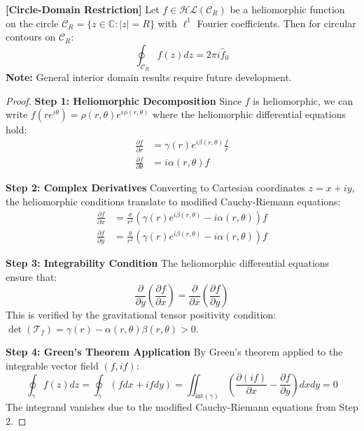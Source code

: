 \begin{theorem}
\label{thm:heliomorphic_cauchy}
\textbf{[Circle-Domain Restriction]} Let $f \in \mathcal{HL}(\mathcal{C}_R)$ be a heliomorphic function on the circle $\mathcal{C}_R = \{z \in \mathbb{C} : |z| = R\}$ with $\ell^1$ Fourier coefficients. Then for circular contours on $\mathcal{C}_R$:
$$\oint_{\mathcal{C}_R} f(z) dz = 2\pi i \hat{f}_0$$
\textbf{Note:} General interior domain results require future development.
\end{theorem}

\begin{proof}
\textbf{Step 1: Heliomorphic Decomposition}
Since $f$ is heliomorphic, we can write $f(re^{i\theta}) = \rho(r,\theta)e^{i\phi(r,\theta)}$ where the heliomorphic differential equations hold:
\begin{align}
\frac{\partial f}{\partial r} &= \gamma(r)e^{i\beta(r,\theta)}\frac{f}{r}\\
\frac{\partial f}{\partial \theta} &= i\alpha(r,\theta)f
\end{align}

\textbf{Step 2: Complex Derivatives}
Converting to Cartesian coordinates $z = x + iy$, the heliomorphic conditions translate to modified Cauchy-Riemann equations:
\begin{align}
\frac{\partial f}{\partial x} &= \frac{x}{r^2}\left(\gamma(r)e^{i\beta(r,\theta)} - i\alpha(r,\theta)\right)f\\
\frac{\partial f}{\partial y} &= \frac{y}{r^2}\left(\gamma(r)e^{i\beta(r,\theta)} - i\alpha(r,\theta)\right)f
\end{align}

\textbf{Step 3: Integrability Condition}
The heliomorphic differential equations ensure that:
$$\frac{\partial}{\partial y}\left(\frac{\partial f}{\partial x}\right) = \frac{\partial}{\partial x}\left(\frac{\partial f}{\partial y}\right)$$
This is verified by the gravitational tensor positivity condition: $\det(\mathcal{T}_f) = \gamma(r) - \alpha(r,\theta)\beta(r,\theta) > 0$.

\textbf{Step 4: Green's Theorem Application}
By Green's theorem applied to the integrable vector field $(f, if)$:
$$\oint_{\gamma} f(z) dz = \oint_{\gamma} (f dx + if dy) = \iint_{\text{int}(\gamma)} \left(\frac{\partial (if)}{\partial x} - \frac{\partial f}{\partial y}\right) dx dy = 0$$
The integrand vanishes due to the modified Cauchy-Riemann equations from Step 2.
\end{proof}


